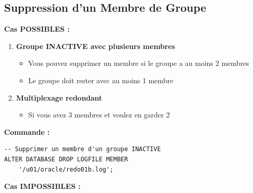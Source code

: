 \documentclass[11pt,a4paper]{article}
\begin{document}
\subsection{Suppression d'un Membre de Groupe}

\textbf{Cas POSSIBLES :}

\begin{enumerate}
    \item \textbf{Groupe INACTIVE avec plusieurs membres}
    \begin{itemize}
        \item Vous pouvez supprimer un membre si le groupe a au moins 2 membres
        \item Le groupe doit rester avec au moins 1 membre
    \end{itemize}
    
    \item \textbf{Multiplexage redondant}
    \begin{itemize}
        \item Si vous avez 3 membres et voulez en garder 2
    \end{itemize}
\end{enumerate}

\textbf{Commande :}

\begin{commandebox}
\begin{lstlisting}
-- Supprimer un membre d'un groupe INACTIVE
ALTER DATABASE DROP LOGFILE MEMBER 
    '/u01/oracle/redo01b.log';
\end{lstlisting}
\end{commandebox}

\textbf{Cas IMPOSSIBLES :}
\end{document}
